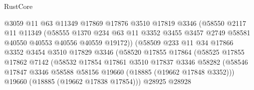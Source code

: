 \begin{lexlean}{RustCore}
\begin{coremodule}
                              @3059
                              @11
                              @63
                              @11349
                              @17869
                              @17876
                              @3510
                              @17819
                              @3346
                              (@58550
                                @2117
                                @11
                                @11349
                                (@58555
                                  @1370
                                  @234
                                  @63
                                  @11
                                  @3352
                                  @3455
                                  @3457
                                  @2749
                                  @58581
                                  @40550
                                  @40553
                                  @40556
                                  @40559
                                  @19172))
                              (@58509
                                @233
                                @11
                                @34
                                @17866
                                @3352
                                @3454
                                @3510
                                @17829
                                @3346
                                (@58520
                                  @17855
                                  @17864
                                  (@58525
                                    @17855
                                    @17862
                                    @7142
                                    (@58532
                                      @17854
                                      @17861
                                      @3510
                                      @17837
                                      @3346
                                      @58282
                                      (@58546
                                        @17847
                                        @3346
                                        @58588
                                        @58156
                                        @19660
                                        (@18885 (@19662 @17848 @3352)))
                                      @19660
                                      (@18885 (@19662 @17838 @17854)))
                                    @28925
                                    @28928

\end{coremodule}
\end{lexlean}
